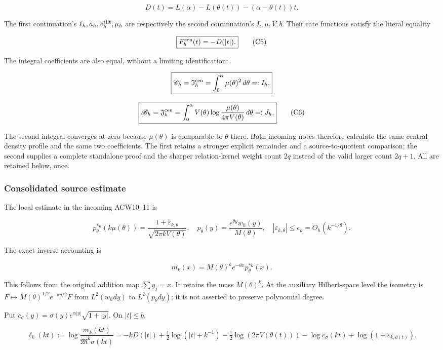 \[
D(t)=L(\alpha)-L(\theta(t))-(\alpha-\theta(t))t.
\tag{C4}
\]

The first continuation's \(\ell_h,a_h,v_h^{\rm tilt},\mu_h\) are respectively the second continuation's \(L,\mu,V,b\). Their rate functions satisfy the literal equality

\[
\boxed{F_h^{\rm cen}(t)=-D(|t|).}
\tag{C5}
\]

The integral coefficients are also equal, without a limiting identification:

\[
\boxed{\mathscr C_h=\mathfrak I_h^{\rm cen}
=\int_0^\alpha\mu(\theta)^2\,d\theta=:I_h,}
\]

\[
\boxed{\mathscr B_h=\mathfrak J_h^{\rm cen}
=\int_0^\alpha V(\theta)
\log\frac{\mu(\theta)}{4\pi V(\theta)}\,d\theta=:J_h.}
\tag{C6}
\]

The second integral converges at zero because \(\mu(\theta)\) is comparable to \(\theta\) there. Both incoming notes therefore calculate the same central density profile and the same two coefficients. The first retains a stronger explicit remainder and a source-to-quotient comparison; the second supplies a complete standalone proof and the sharper relation-kernel weight count \(2q\) instead of the valid larger count \(2q+1\). All are retained below, once.

\subsubsection{Consolidated source estimate}\label{consolidated-source-estimate}

The local estimate in the incoming ACW10--11 is

\[
p_\theta^{*k}(k\mu(\theta))
=\frac{1+\varepsilon_{k,\theta}}{\sqrt{2\pi kV(\theta)}},
\quad p_\theta(y)=\frac{e^{\theta y}w_h(y)}{M(\theta)},
\quad |\varepsilon_{k,\theta}|\le\epsilon_k=O_h(k^{-1/8}).
\tag{C7}
\]

The exact inverse accounting is

\[
m_k(x)=M(\theta)^k e^{-\theta x}p_\theta^{*k}(x).
\tag{C8}
\]

This follows from the original addition map \(\sum y_j=x\). It retains the mass \(M(\theta)^k\). At the auxiliary Hilbert-space level the isometry is
\(F\mapsto M(\theta)^{1/2}e^{-\theta y/2}F\) from \(L^2(w_hdy)\) to \(L^2(p_\theta dy)\); it is not asserted to preserve polynomial degree.

Put \(c_\sigma(y)=\sigma(y)e^{\alpha|y|}\sqrt{1+|y|}\). On \(|t|\le b\),

\[
\ell_k(kt):=\log\frac{m_k(kt)}{\mathfrak M^k\sigma(kt)}
=-kD(|t|)+\tfrac12\log(|t|+k^{-1})
-\tfrac12\log(2\pi V(\theta(t)))-\log c_\sigma(kt)
+\log(1+\varepsilon_{k,\theta(t)}).
\tag{C9}
\]

